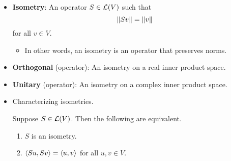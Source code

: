 \documentclass[../main.tex]{subfiles}
\begin{document}
\begin{itemize}
\begin{theorem}
\begin{proof}
\begin{equation*}
                v = a_1e_1+\cdots+a_ne_n
            \end{equation*}
            for $a_1,\dots,a_n\in\F$. Then
            \begin{equation*}
                a_1\lambda e_1+\cdots+a_n\lambda e_n = Tv = R^2v = a_1\lambda_1e_1+\cdots+a_n\lambda_ne_n
            \end{equation*}
            so since $e_1,\dots,e_n$ is linearly independent, $a_j(\lambda-\lambda_j)=0$ for all $j$. It follows that
            \begin{equation*}
                v = \sum_{\{j:\lambda_j=\lambda\}}a_je_j
            \end{equation*}
            so that
            \begin{align*}
                Rv &= \sum_{j=1}^na_j\sqrt{\lambda_j}e_j\\
                &= \sum_{\{j:\lambda_j=\lambda\}}a_j\sqrt{\lambda_j}e_j\\
                &= \sum_{\{j:\lambda_j=\lambda\}}a_j\sqrt{\lambda}e_j\\
                &= \sqrt{\lambda}v
            \end{align*}
            as desired.
        \end{proof}
    \end{theorem}
    \item \textbf{Isometry}: An operator $S\in\mathcal{L}(V)$ such that
    \begin{equation*}
        \norm{Sv} = \norm{v}
    \end{equation*}
    for all $v\in V$.
    \begin{itemize}
        \item In other words, an isometry is an operator that preserves norms.
    \end{itemize}
    \item \textbf{Orthogonal} (operator): An isometry on a real inner product space.
    \item \textbf{Unitary} (operator): An isometry on a complex inner product space.
    \item Characterizing isometries.
    \begin{theorem}
        Suppose $S\in\mathcal{L}(V)$. Then the following are equivalent.
        \begin{enumerate}[label={\textup{(}\alph*\textup{)}}]
            \item $S$ is an isometry.
            \item $\left\langle{Su},{Sv}\right\rangle=\left\langle{u},{v}\right\rangle$ for all $u,v\in V$.

\end{enumerate}
\end{theorem}
\end{itemize}
\end{document}
